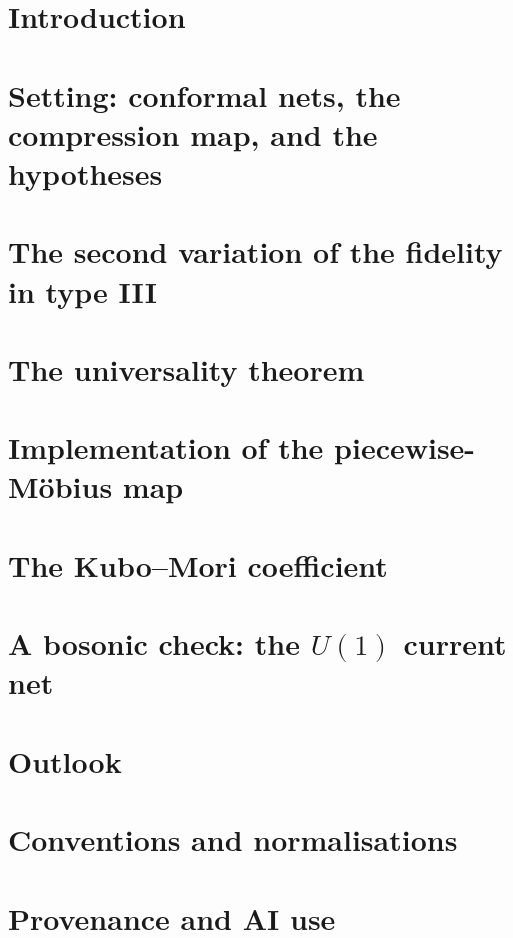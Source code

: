\documentclass[11pt,a4paper]{article}
\theoremstyle{definition}\newtheorem{definition}[theorem]{Definition}\newtheorem{remark}[theorem]{Remark}\newtheorem{hypothesis}[theorem]{Hypothesis}
\begin{document}
\section{Introduction}\label{sec:intro}

\section{Setting: conformal nets, the compression map, and the hypotheses}\label{sec:setting}

\section{The second variation of the fidelity in type III}\label{sec:secvar}

\section{The universality theorem}\label{sec:univ}

\section{Implementation of the piecewise-M\"obius map}\label{sec:impl}

\section{The Kubo--Mori coefficient}\label{sec:km}

\section{A bosonic check: the \texorpdfstring{$U(1)$}{U(1)} current net}\label{sec:boson}

\section{Outlook}\label{sec:outlook}

\appendix
\section{Conventions and normalisations}\label{app:conv}

\section*{Provenance and AI use}
\end{document}
